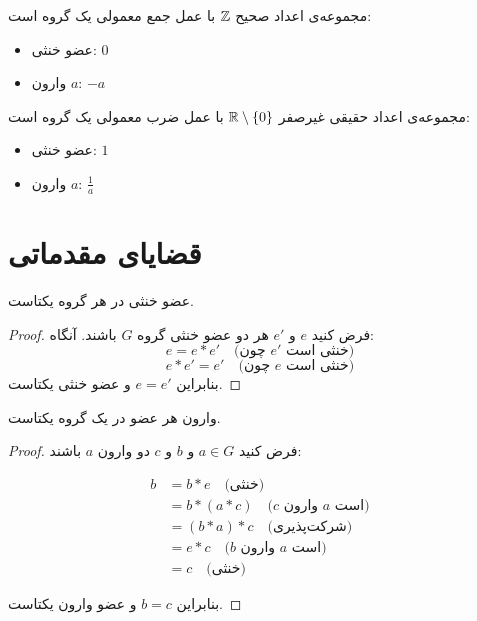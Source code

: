 \documentclass{matinbook}
\begin{document}
\begin{example}
    مجموعه‌ی اعداد صحیح $\mathbb{Z}$ با عمل جمع معمولی یک گروه است:

    \begin{itemize}
        \item عضو خنثی: $0$
        \item وارون $a$: $-a$
    \end{itemize}
    \label{ex:z-group}
\end{example}

\begin{example}
    مجموعه‌ی اعداد حقیقی غیرصفر $\mathbb{R} \setminus \{0\}$ با
    عمل ضرب معمولی یک گروه است:

    \begin{itemize}
        \item عضو خنثی: $1$
        \item وارون $a$: $\frac{1}{a}$
    \end{itemize}
    \label{ex:r-group}
\end{example}

\section{قضایای مقدماتی}
\label{sec:grouptheory-basic}

\begin{theorem}
    عضو خنثی در هر گروه یکتاست.
    \label{thm:unique-identity}
\end{theorem}

\begin{proof}
    فرض کنید $e$ و $e'$ هر دو عضو خنثی گروه $G$ باشند.
    آنگاه:
    \[
    e = e * e' \quad \text{(چون $e'$ خنثی است)}
    \]
    \[
    e * e' = e' \quad \text{(چون $e$ خنثی است)}
    \]
    بنابراین $e = e'$ و عضو خنثی یکتاست.
\end{proof}

\begin{theorem}
    وارون هر عضو در یک گروه یکتاست.
    \label{thm:unique-inverse}
\end{theorem}

\begin{proof}
    فرض کنید $a \in G$ و $b$ و $c$ دو وارون $a$ باشند:

    \begin{align*}
        b &= b * e \quad \text{(خنثی)} \\
        &= b * (a * c) \quad \text{($c$ وارون $a$ است)} \\
        &= (b * a) * c \quad \text{(شرکت‌پذیری)} \\
        &= e * c \quad \text{($b$ وارون $a$ است)} \\
        &= c \quad \text{(خنثی)}
    \end{align*}

    بنابراین $b = c$ و عضو وارون یکتاست.
\end{proof}
\end{document}
